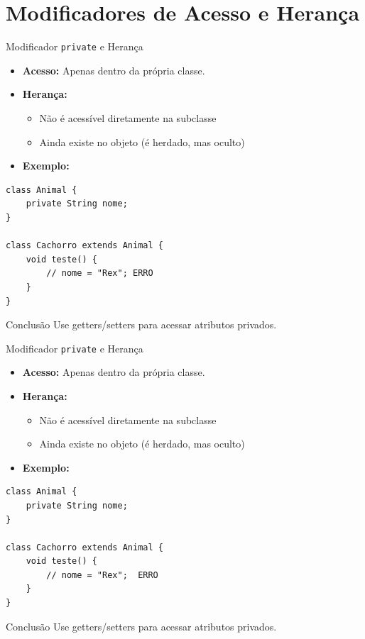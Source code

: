 \documentclass[9pt]{beamer}
\begin{document}
\section{Modificadores de Acesso e Herança}
\begin{frame}[fragile]{Modificador \texttt{private} e Herança}
\begin{itemize}
    \item \textbf{Acesso:} Apenas dentro da própria classe.
    \item \textbf{Herança:}
    \begin{itemize}
        \item  Não é acessível diretamente na subclasse
        \item Ainda existe no objeto (é herdado, mas oculto)
    \end{itemize}
    
    \item \textbf{Exemplo:}
\end{itemize}

\begin{lstlisting}
class Animal {
    private String nome;
}

class Cachorro extends Animal {
    void teste() {
        // nome = "Rex"; ERRO
    }
}
\end{lstlisting}

\begin{block}{Conclusão}
Use getters/setters para acessar atributos privados.
\end{block}
\end{frame}
\begin{frame}[fragile]{Modificador \texttt{private} e Herança}
\begin{itemize}
    \item \textbf{Acesso:} Apenas dentro da própria classe.
    \item \textbf{Herança:}
    \begin{itemize}
        \item  Não é acessível diretamente na subclasse
        \item Ainda existe no objeto (é herdado, mas oculto)
    \end{itemize}
    
    \item \textbf{Exemplo:}
\end{itemize}

\begin{lstlisting}
class Animal {
    private String nome;
}

class Cachorro extends Animal {
    void teste() {
        // nome = "Rex";  ERRO
    }
}
\end{lstlisting}

\begin{block}{Conclusão}
Use getters/setters para acessar atributos privados.
\end{block}
\end{frame}
\end{document}
